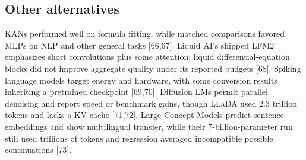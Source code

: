 \subsection{Other alternatives}
KANs performed well on formula fitting, while matched comparisons favored MLPs on NLP and other general tasks [66,67]. Liquid AI's shipped LFM2 emphasizes short convolutions plus some attention; liquid differential-equation blocks did not improve aggregate quality under its reported budgets [68]. Spiking language models target energy and hardware, with some conversion results inheriting a pretrained checkpoint [69,70]. Diffusion LMs permit parallel denoising and report speed or benchmark gains, though LLaDA used 2.3 trillion tokens and lacks a KV cache [71,72]. Large Concept Models predict sentence embeddings and show multilingual transfer, while their 7-billion-parameter run still used trillions of tokens and regression averaged incompatible possible continuations [73].

